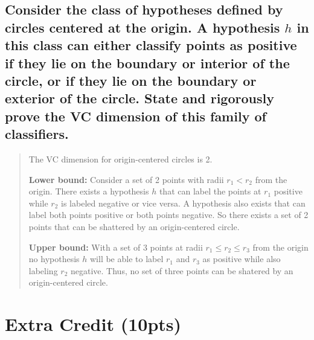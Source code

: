 \documentclass[11pt]{article}
\begin{document}
\subsection{Consider the class of hypotheses defined by circles centered at the origin. A hypothesis $h$ in this class can either classify points as positive if they lie on the boundary or interior of the circle, or if they lie on the boundary or exterior of the circle. State and rigorously prove the VC dimension of this family of classifiers.}
\begin{quote}

	\vspace{3 mm}

	The VC dimension for origin-centered circles is 2.
	
	\vspace{1 mm}

	\textbf{Lower bound:} Consider a set of 2 points with radii $r_1 < r_2$ from the origin. There exists a hypothesis $h$ that can label the points at $r_1$ positive while $r_2$ is labeled negative or vice versa. A hypothesis also exists that can label both points positive or both points negative. So there exists a set of 2 points that can be shattered by an origin-centered circle. 
	
	\vspace{1 mm}

	\textbf{Upper bound:} With a set of 3 points at radii $r_1 \leq r_2 \leq r_3$ from the origin no hypothesis $h$ will be able to label $r_1$ and $r_3$ as positive while also labeling $r_2$ negative. Thus, no set of three points can be shatered by an origin-centered circle.
\end{quote}

\section{Extra Credit (10pts)}
\end{document}
